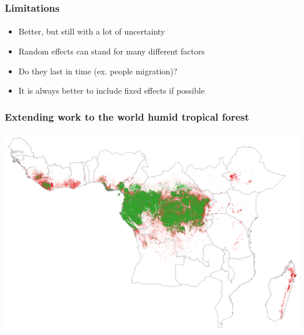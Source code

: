 \documentclass[slidetop,10pt,dvipsnames,leqno,fleqn]{beamer} %
\begin{document}
\begin{frame}
  \frametitle{Limitations}
  \framesubtitle{}
  \begin{block}{}
    \begin{itemize}
    \item Better, but still with a lot of uncertainty 
    \item Random effects can stand for many different factors
    \item Do they last in time (ex. people migration)? 
    \item It is always better to include fixed effects if possible
    \end{itemize}
  \end{block}
\end{frame}

\begin{frame}
  \frametitle{Extending work to the world humid tropical forest}
  \framesubtitle{}
  \centering \includegraphics[width=\textwidth]{./Figures/fcc_35yr.png}
\end{frame}
\end{document}
